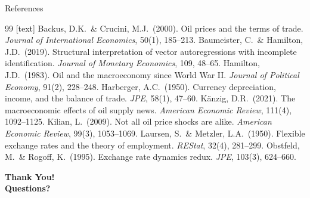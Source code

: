 \documentclass[10pt,aspectratio=169]{beamer}
\begin{document}
\begin{frame}{References}
  \begin{thebibliography}{99}
    [text]
    \footnotesize
     Backus, D.K.\ \& Crucini, M.J.\ (2000). Oil prices and the terms of trade. \textit{Journal of International Economics}, 50(1), 185--213.
     Baumeister, C.\ \& Hamilton, J.D.\ (2019). Structural interpretation of vector autoregressions with incomplete identification. \textit{Journal of Monetary Economics}, 109, 48--65.
     Hamilton, J.D.\ (1983). Oil and the macroeconomy since World War II. \textit{Journal of Political Economy}, 91(2), 228--248.
     Harberger, A.C.\ (1950). Currency depreciation, income, and the balance of trade. \textit{JPE}, 58(1), 47--60.
     K\"anzig, D.R.\ (2021). The macroeconomic effects of oil supply news. \textit{American Economic Review}, 111(4), 1092--1125.
     Kilian, L.\ (2009). Not all oil price shocks are alike. \textit{American Economic Review}, 99(3), 1053--1069.
     Laursen, S.\ \& Metzler, L.A.\ (1950). Flexible exchange rates and the theory of employment. \textit{REStat}, 32(4), 281--299.
     Obstfeld, M.\ \& Rogoff, K.\ (1995). Exchange rate dynamics redux. \textit{JPE}, 103(3), 624--660.
  \end{thebibliography}
\end{frame}

\begin{frame}{}
  \vfill
  \centering
  \Huge\bfseries Thank You!\\[0.5cm]
  \large Questions?
  \vfill
\end{frame}
\end{document}
